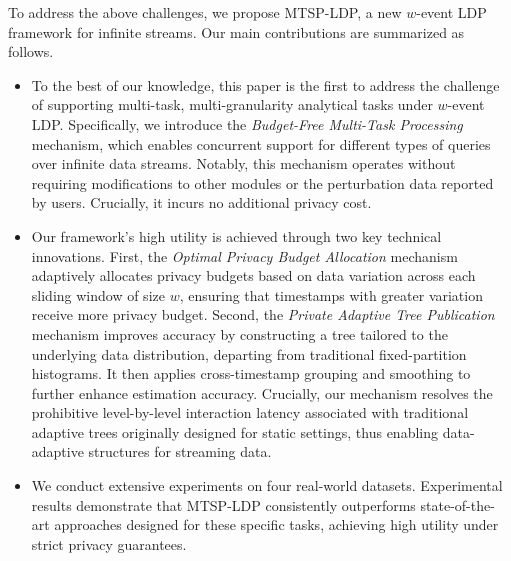 To address the above challenges, we propose MTSP-LDP, a new $w$-event LDP
framework for infinite streams.
Our main contributions are summarized as follows.
\begin{itemize}[nosep]
\item {To the best of our knowledge, this paper is the first to address the
  challenge of supporting multi-task, multi-granularity analytical tasks under
  $w$-event LDP.
  Specifically, we introduce the \emph{Budget-Free Multi-Task Processing}
  mechanism, which enables concurrent support for different types of queries
  over infinite data streams.
  Notably, this mechanism operates without requiring modifications to other
  modules or the perturbation data reported by users.
  Crucially, it incurs no additional privacy cost.}

\item {Our framework's high utility is achieved through two key technical
  innovations.
  First, the \emph{Optimal Privacy Budget Allocation} mechanism adaptively
  allocates privacy budgets based on data variation across each sliding window
  of size $w$, ensuring that timestamps with greater variation receive more
  privacy budget.
  Second, the \emph{Private Adaptive Tree Publication} mechanism improves accuracy by constructing a tree tailored to the underlying data distribution, departing from traditional fixed-partition histograms. It then applies cross-timestamp grouping and smoothing to further enhance estimation accuracy. Crucially, our mechanism resolves the prohibitive level-by-level interaction latency associated with traditional adaptive trees originally designed for static settings, thus enabling data-adaptive structures for streaming data.}

\item We conduct extensive experiments on four real-world datasets.
  Experimental results demonstrate that MTSP-LDP consistently outperforms
  state-of-the-art approaches designed for these specific tasks, achieving high
  utility under strict privacy guarantees.
\end{itemize}

